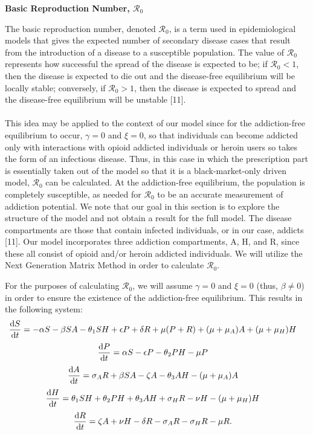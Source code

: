 \documentclass[12pt]{article}
\begin{document}
\textbf{Basic Reproduction Number, \textbf{$\mathscr{R}_0$}}

The basic reproduction number, denoted $\mathscr{R}_0$, is a term used in epidemiological models that gives the expected number of secondary disease cases that result from the introduction of a disease to a susceptible population. The value of $\mathscr{R}_0$ represents how successful the spread of the disease is expected to be; if $\mathscr{R}_0 < 1$, then the disease is expected to die out and the disease-free equilibrium will be locally stable; conversely, if $\mathscr{R}_0 >1$, then the disease is expected to spread and the disease-free equilibrium will be unstable [11]. \\ \\
 This idea may be applied to the context of our model since for the addiction-free equilibrium to occur, $\gamma=0$ and $\xi=0$, so that individuals can become addicted only with interactions with opioid addicted individuals or heroin users so takes the form of an infectious disease. Thus, in this case in which the prescription part is essentially taken out of the model so that it is a black-market-only driven model, $\mathscr{R}_0$ can be calculated. At the addiction-free equilibrium, the population is completely susceptible, as needed for $\mathscr{R}_0$ to be an accurate measurement of addiction potential. 
We note that our goal in this section is to explore the structure of the model and not obtain a result for the full model. The disease compartments are those that contain infected individuals, or in our case, addicts [11]. Our model incorporates three addiction compartments, A, H, and R, since these all consist of opioid and/or heroin addicted individuals. We will utilize the Next Generation Matrix Method in order to calculate $\mathscr{R}_0$.


For the purposes of calculating $\mathscr{R}_0$, we will assume $\gamma =0$ and $\xi =0$ (thus, $\beta \neq 0$) in order to ensure the existence of the addiction-free equilibrium. This results in the following system:
\[\dv{S}{t} = -\alpha S - \beta SA  - \theta_{1} SH +\epsilon P +\delta R +\mu (P+R) + (\mu+\mu_{A})A + (\mu+\mu_{H}) H \quad \] 
\[\dv{P}{t} = \alpha S - \epsilon P  - \theta_{2}PH- \mu P    \quad\]
\[\dv{A}{t} = \sigma_{A} R +\beta SA  -\zeta A - \theta_{3}AH-(\mu + \mu_{A})A   \quad\]
\[\dv{H}{t} = \theta_{1}SH+\theta_{2}PH+\theta_{3}AH + \sigma_{H}R-\nu H-(\mu+\mu_{H})H  \quad\]
\[\dv{R}{t} = \zeta A +\nu H -\delta R -\sigma_{A}R-\sigma_{H}R -\mu R.\quad\]
\end{document}
